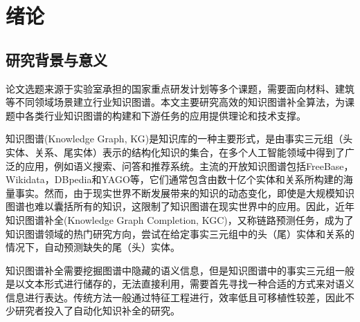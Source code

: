 \chapter{绪论}

\section{研究背景与意义}
论文选题来源于实验室承担的国家重点研发计划等多个课题，需要面向材料、建筑等不同领域场景建立行业知识图谱。本文主要研究高效的知识图谱补全算法，为课题中各类行业知识图谱的构建和下游任务的应用提供理论和技术支撑。

知识图谱(Knowledge Graph, KG)是知识库的一种主要形式，是由事实三元组（头实体、关系、尾实体）表示的结构化知识的集合，在多个人工智能领域中得到了广泛的应用，例如语义搜索、问答和推荐系统。主流的开放知识图谱包括FreeBase，Wikidata，DBpedia和YAGO等，它们通常包含由数十亿个实体和关系所构建的海量事实。然而，由于现实世界不断发展带来的知识的动态变化，即使是大规模知识图谱也难以囊括所有的知识，这限制了知识图谱在现实世界中的应用。因此，近年知识图谱补全(Knowledge Graph Completion, KGC)，又称链路预测任务，成为了知识图谱领域的热门研究方向，尝试在给定事实三元组中的头（尾）实体和关系的情况下，自动预测缺失的尾（头）实体。



知识图谱补全需要挖掘图谱中隐藏的语义信息，但是知识图谱中的事实三元组一般是以文本形式进行储存的，无法直接利用，需要首先寻找一种合适的方式来对语义信息进行表达。传统方法一般通过特征工程进行，效率低且可移植性较差，因此不少研究者投入了自动化知识补全的研究。

